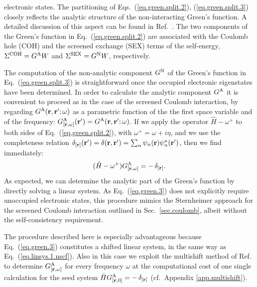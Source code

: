 \documentclass[twocolumn,prb,showpacs,superscriptaddress]{revtex4}
\def\w{\omega}
\def\H{\hat{H}}
\def\r{{\bf r}}
\def\rp{{\bf r^\prime}}
\begin{document}
electronic states. 
The partitioning of Eqs.\ (\ref{eq.green.split.2}),
(\ref{eq.green.split.3}) closely reflects the analytic structure
of the non-interacting Green's function.
A detailed discussion of this aspect can be found in Ref.\ .
The two components of the Green's function in Eq.\ (\ref{eq.green.split.2}) 
are associated with the Coulomb hole (COH) and the screened exchange (SEX) terms of the
self-energy, 
$\Sigma^{\rm COH} = G^{\rm A} W$  and $\Sigma^{\rm SEX} = G^{\rm N} W$,
respectively.\cite{hl86}

The computation of the non-analytic component $G^{\rm N}$ of the
Green's function in Eq.\ (\ref{eq.green.split.3}) is straightforward 
once the occupied electronic eigenstates have been determined.
In order to calculate the analytic component $G^{\rm A}$ it is convenient to
proceed as in the case of the screened Coulomb interaction,
by regarding $G^{\rm A}(\r,\rp;\w)$ as a parametric
function of the the first space variable and of the frequency:
$G^{\rm A}_{[\r,\w]}(\rp) = G^{\rm A}(\r,\rp;\w)$.
If we apply the operator $\H-\w^+$ to both sides of Eq.\ (\ref{eq.green.split.2}),
with $\w^+=\w+i\eta$,
and we use the completeness relation $\delta_{[\r]}(\rp) = \delta(\r,\rp) = \sum_n \psi_n(\r)\psi_n^\star(\rp)$, then we find immediately:
  \begin{equation}\label{eq.green.3}
  (\H-\w^+) G^{\rm A}_{[\r,\w]} = -\, \delta_{[\r]}.
  \end{equation}
As expected, we can determine the analytic part of the Green's function
by directly solving a linear system. As Eq.\ (\ref{eq.green.3}) 
does not explicitly require unoccupied electronic states, this procedure mimics 
the Sternheimer approach for the screened Coulomb interaction outlined in Sec.~\ref{sec.coulomb},
albeit without the self-consistency requirement.

The procedure described here is especially advantageous because Eq.\ (\ref{eq.green.3})
constitutes a shifted linear system, in the same way as Eq.\ (\ref{eq.linsys.1.nscf}).
Also in this case we exploit the multishift method of Ref.\ 
to determine $G^{\rm A}_{[\r,\w]}$ for every frequency $\w$
at the computational cost of one single calculation for the seed system $\H G^{\rm A}_{[\r,0]} = -\, \delta_{[\r]}$
(cf.\ Appendix \ref{app.multishift}).
\end{document}
